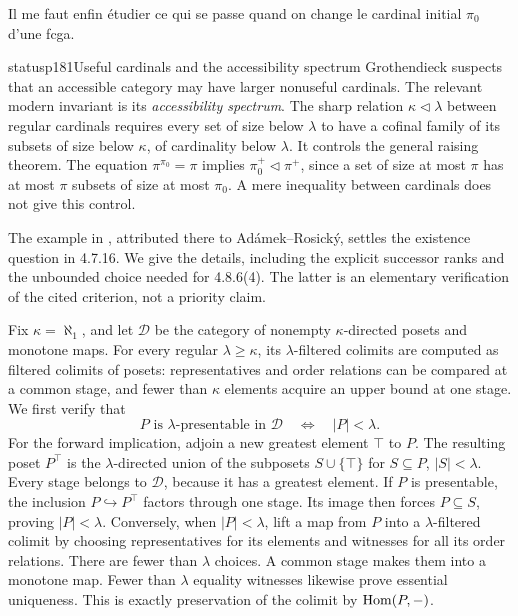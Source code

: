 \noindent{}Il me faut enfin étudier ce qui se passe quand on change le cardinal initial $\pi_0$ d'une fcga.

\begin{dcomment}{status}{p181}{Useful cardinals and the accessibility spectrum}
Grothendieck suspects that an accessible category may have larger nonuseful cardinals. The relevant modern invariant is its \emph{accessibility spectrum}. The sharp relation $\kappa\mathrel{\triangleleft}\lambda$ between regular cardinals requires every set of size below $\lambda$ to have a cofinal family of its subsets of size below $\kappa$, of cardinality below $\lambda$. It controls the general raising theorem. The equation $\pi^{\pi_0}=\pi$ implies $\pi_0^+\mathrel{\triangleleft}\pi^+$, since a set of size at most $\pi$ has at most $\pi$ subsets of size at most $\pi_0$. A mere inequality between cardinals does not give this control.

The example in \citet[Remark 3.7 and Example 3.8]{Vasey2020Accessible}, attributed there to Ad\'amek--Rosick\'y, settles the existence question in 4.7.16. We give the details, including the explicit successor ranks and the unbounded choice needed for 4.8.6(4). The latter is an elementary verification of the cited criterion, not a priority claim.

Fix $\kappa=\aleph_1$, and let $\mathcal D$ be the category of nonempty $\kappa$-directed posets and monotone maps. For every regular $\lambda\geq\kappa$, its $\lambda$-filtered colimits are computed as filtered colimits of posets: representatives and order relations can be compared at a common stage, and fewer than $\kappa$ elements acquire an upper bound at one stage. We first verify that
\[
 P\text{ is }\lambda\text{-presentable in }\mathcal D
 \quad\Longleftrightarrow\quad |P|<\lambda.
\]
For the forward implication, adjoin a new greatest element $\top$ to $P$. The resulting poset $P^\top$ is the $\lambda$-directed union of the subposets $S\cup\{\top\}$ for $S\subseteq P$, $|S|<\lambda$. Every stage belongs to $\mathcal D$, because it has a greatest element. If $P$ is presentable, the inclusion $P\hookrightarrow P^\top$ factors through one stage. Its image then forces $P\subseteq S$, proving $|P|<\lambda$. Conversely, when $|P|<\lambda$, lift a map from $P$ into a $\lambda$-filtered colimit by choosing representatives for its elements and witnesses for all its order relations. There are fewer than $\lambda$ choices. A common stage makes them into a monotone map. Fewer than $\lambda$ equality witnesses likewise prove essential uniqueness. This is exactly preservation of the colimit by $\operatorname{Hom}(P,-)$.


\end{dcomment}
